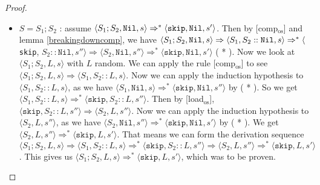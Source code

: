 \begin{proof}
\begin{itemize}
    \item $S = S_1; S_2$ : assume $\langle  S_1;S_2, \texttt{Nil},  s \rangle \Rightarrow ^{*} \langle \texttt{skip}, \texttt{Nil}, s' \rangle$. Then by [comp$_{\textrm{os}}$] and lemma \ref{breakingdowncomp}, we have $\langle S_1;S_2, \texttt{Nil}, s \rangle \Rightarrow \langle S_1, S_2::\texttt{Nil}, s \rangle \Rightarrow ^{*} \langle$ \texttt{skip}, $S_2::\texttt{Nil}, s'' \rangle \Rightarrow \langle S_2, \texttt{Nil}, s'' \rangle \Rightarrow ^{*} \langle \texttt{skip}, \texttt{Nil}, s' \rangle$ ( * ). Now we look at $\langle S_1;S_2, L, s \rangle$ with $L$ random. We can apply the rule [comp$_{\textrm{os}}$] to see $\langle S_1;S_2, L, s \rangle \Rightarrow \langle S_1, S_2::L, s \rangle$. Now we can apply the induction hypothesis to $\langle S_1, S_2::L, s \rangle$, as we have $\langle S_1, \texttt{Nil}, s \rangle \Rightarrow ^{*} \langle \texttt{skip}, \texttt{Nil}, s'' \rangle$ by ( * ). So we get $\langle S_1, S_2::L, s \rangle \Rightarrow ^{*} \langle \texttt{skip}, S_2::L, s'' \rangle$. Then by [load$_{\textrm{os}}$], $\langle \texttt{skip}, S_2::L, s'' \rangle \Rightarrow \langle S_2 , L , s''\rangle$. Now we can apply the induction hypothesis to $\langle S_2 , L , s''\rangle$, as we have $\langle S_2, \texttt{Nil}, s''\rangle \Rightarrow ^{*} \langle \texttt{skip}, \texttt{Nil}, s'\rangle$ by ( * ). We get $\langle S_2 , L , s''\rangle \Rightarrow ^{*} \langle \texttt{skip}, L, s'\rangle$. That means we can form the derivation sequence $\langle S_1;S_2, L, s \rangle \Rightarrow \langle S_1, S_2::L, s \rangle \Rightarrow ^{*} \langle \texttt{skip}, S_2::L, s'' \rangle \Rightarrow \langle S_2 , L , s''\rangle \Rightarrow ^{*} \langle \texttt{skip}, L, s'\rangle$. This gives us $\langle S_1;S_2, L, s \rangle  \Rightarrow ^{*} \langle \texttt{skip}, L, s'\rangle$, which was to be proven. 
        

\end{itemize}
\end{proof}

